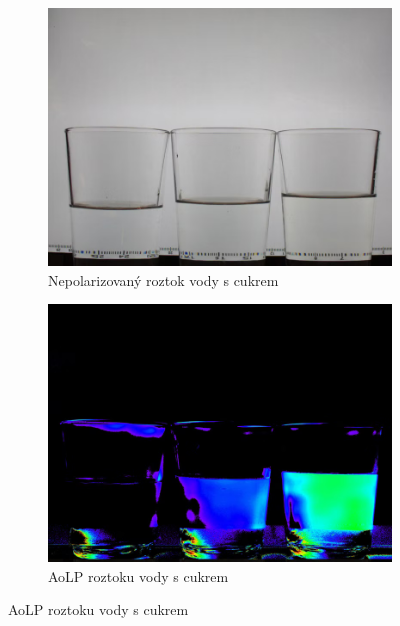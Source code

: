 \documentclass[a4paper]{article}
\numberwithin{equation}{section}
\begin{document}
    \begin{figure}[htbp]
        \centering
        \begin{subfigure}[h]{0.35\textwidth}
            \includegraphics[width=\textwidth]{figures/Sugar-Water-Non-Polarized-Image.png}
            \caption{Nepolarizovaný roztok vody s cukrem}
        \end{subfigure}
        \hfill
        \begin{subfigure}[h]{0.35\textwidth}
            \includegraphics[width=\textwidth]{figures/Sugar-Water-Polarized-Image.png}
            \caption{AoLP roztoku vody s cukrem}
        \end{subfigure}
    \end{figure}
\end{document}
